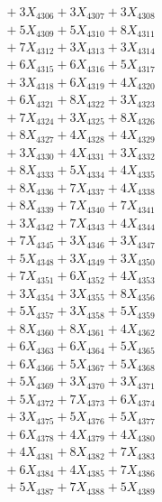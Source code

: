 \documentclass[a4paper,10pt]{article}
\begin{document}
{\begin{align}
&\;  + 3 X_{4306} + 3 X_{4307} + 3 X_{4308} \\[0.3ex]
&\;  + 5 X_{4309} + 5 X_{4310} + 8 X_{4311} \\[0.3ex]
&\;  + 7 X_{4312} + 3 X_{4313} + 3 X_{4314} \\[0.3ex]
&\;  + 6 X_{4315} + 6 X_{4316} + 5 X_{4317} \\[0.3ex]
&\;  + 3 X_{4318} + 6 X_{4319} + 4 X_{4320} \\[0.3ex]
&\;  + 6 X_{4321} + 8 X_{4322} + 3 X_{4323} \\[0.3ex]
&\;  + 7 X_{4324} + 3 X_{4325} + 8 X_{4326} \\[0.3ex]
&\;  + 8 X_{4327} + 4 X_{4328} + 4 X_{4329} \\[0.5ex]\allowbreak
&\;  + 3 X_{4330} + 4 X_{4331} + 3 X_{4332} \\[0.3ex]
&\;  + 8 X_{4333} + 5 X_{4334} + 4 X_{4335} \\[0.3ex]
&\;  + 8 X_{4336} + 7 X_{4337} + 4 X_{4338} \\[0.3ex]
&\;  + 8 X_{4339} + 7 X_{4340} + 7 X_{4341} \\[0.3ex]
&\;  + 3 X_{4342} + 7 X_{4343} + 4 X_{4344} \\[0.3ex]
&\;  + 7 X_{4345} + 3 X_{4346} + 3 X_{4347} \\[0.3ex]
&\;  + 5 X_{4348} + 3 X_{4349} + 3 X_{4350} \\[0.3ex]
&\;  + 7 X_{4351} + 6 X_{4352} + 4 X_{4353} \\[0.3ex]
&\;  + 3 X_{4354} + 3 X_{4355} + 8 X_{4356} \\[0.3ex]
&\;  + 5 X_{4357} + 3 X_{4358} + 5 X_{4359} \\[0.5ex]\allowbreak
&\;  + 8 X_{4360} + 8 X_{4361} + 4 X_{4362} \\[0.3ex]
&\;  + 6 X_{4363} + 6 X_{4364} + 5 X_{4365} \\[0.3ex]
&\;  + 6 X_{4366} + 5 X_{4367} + 5 X_{4368} \\[0.3ex]
&\;  + 5 X_{4369} + 3 X_{4370} + 3 X_{4371} \\[0.3ex]
&\;  + 5 X_{4372} + 7 X_{4373} + 6 X_{4374} \\[0.3ex]
&\;  + 3 X_{4375} + 5 X_{4376} + 5 X_{4377} \\[0.3ex]
&\;  + 6 X_{4378} + 4 X_{4379} + 4 X_{4380} \\[0.3ex]
&\;  + 4 X_{4381} + 8 X_{4382} + 7 X_{4383} \\[0.3ex]
&\;  + 6 X_{4384} + 4 X_{4385} + 7 X_{4386} \\[0.3ex]
&\;  + 5 X_{4387} + 7 X_{4388} + 5 X_{4389} \\[0.5ex]\allowbreak

\end{align}}
\end{document}
